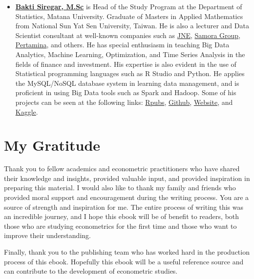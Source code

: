 \documentclass[
]{book}
\providecommand{\tightlist}{%
  \setlength{\itemsep}{0pt}\setlength{\parskip}{0pt}}
\begin{document}
\begin{itemize}
\tightlist
\item
  \textbf{\href{https://www.linkedin.com/in/dsciencelabs/}{Bakti Siregar, M.Sc}} is Head of the Study Program at the Department of Statistics, Matana University. Graduate of Masters in Applied Mathematics from National Sun Yat Sen University, Taiwan. He is also a lecturer and Data Scientist consultant at well-known companies such as \href{https://www.jne.co.id/id/beranda}{JNE}, \href{https://www.samoragroup.co.\%20id/home/en}{Samora Group}, \href{https://www.pertamina.com/}{Pertamina}, and others. He has special enthusiasm in teaching Big Data Analytics, Machine Learning, Optimization, and Time Series Analysis in the fields of finance and investment. His expertise is also evident in the use of Statistical programming languages such as R Studio and Python. He applies the MySQL/NoSQL database system in learning data management, and is proficient in using Big Data tools such as Spark and Hadoop. Some of his projects can be seen at the following links: \href{https://rpubs.com/dsciencelabs}{Rpubs}, \href{https://github.com/dsciencelabs}{Github}, \href{https://dsciencelabs.github\%20.io/web/index.html}{Website}, and \href{https://www.kaggle.com/baktisiregar/code}{Kaggle}.
\end{itemize}

\hypertarget{my-gratitude}{%
\section*{My Gratitude}\label{my-gratitude}}

Thank you to fellow academics and econometric practitioners who have shared their knowledge and insights, provided valuable input, and provided inspiration in preparing this material. I would also like to thank my family and friends who provided moral support and encouragement during the writing process. You are a source of strength and inspiration for me. The entire process of writing this was an incredible journey, and I hope this ebook will be of benefit to readers, both those who are studying econometrics for the first time and those who want to improve their understanding.

Finally, thank you to the publishing team who has worked hard in the production process of this ebook. Hopefully this ebook will be a useful reference source and can contribute to the development of econometric studies.
\end{document}
